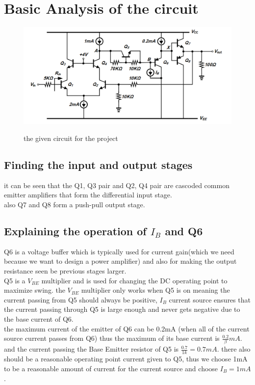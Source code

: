 \documentclass[11pt]{article}
\begin{document}
\section{Basic Analysis of the circuit}

\begin{figure}[H]
    \begin{center}
        \includegraphics[scale=0.7]{Fig/circuitGiven.png}
        \label{fig:circuitGiven}
        \caption{the given circuit for the project}
    \end{center}
\end{figure}

\subsection{Finding the input and output stages}
it can be seen that the Q1, Q3 pair and Q2, Q4 pair are cascoded common emitter amplifiers
that form the differential input stage. \\
also Q7 and Q8 form a push-pull output stage.\\

\subsection{Explaining the operation of $I_B$ and Q6}
Q6 is a voltage buffer which is typically used for current gain(which we need because 
we want to design a power amplifier) and also for making the output resistance seen
be previous stages larger. \\
Q5 is a $V_{BE}$ multiplier and is used for changing the DC operating point to maximize swing.
the $V_{BE}$ multiplier only works when Q5 is on meaning the current passing from Q5
should always be positive, $I_B$ current source ensures that the current passing through Q5
is large enough and never gets negative due to the base current of Q6. \\
the maximum current of the emitter of Q6 can be 0.2mA (when all of the current source
current passes from Q6) thus the maximum of its base current is $\frac{0.2}{\beta}mA$. \\
and the current passing the Base Emitter resistor of Q5 is $ \frac{0.7}{1k} = 0.7mA $. there 
also should be a reasonable operating point current given to Q5, thus we choose
1mA to be a reasonable amount of current for the current source and choose
$I_B = 1mA$. 
\end{document}

